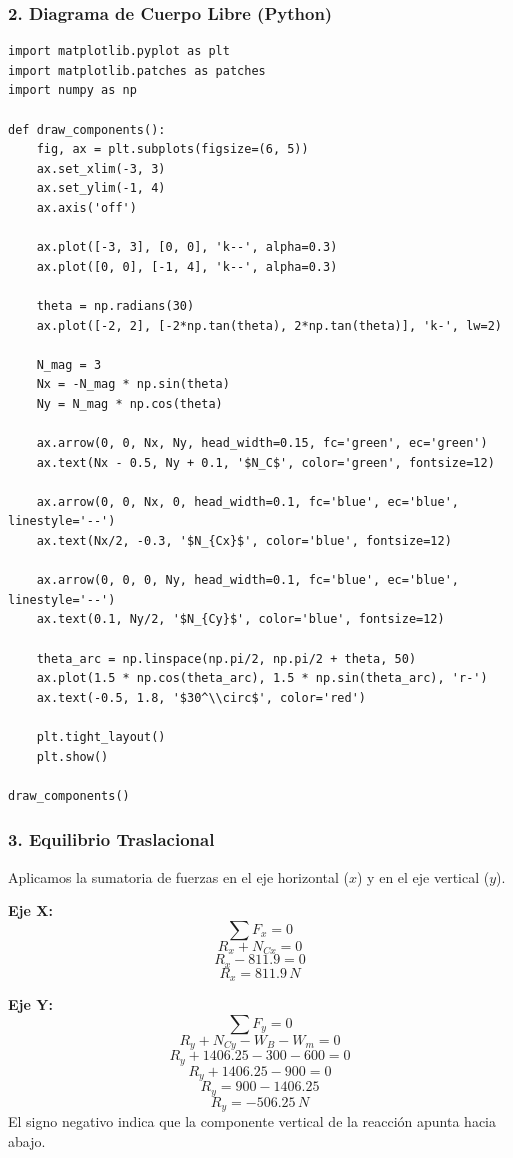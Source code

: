 \documentclass[12pt, a4paper]{article}
\begin{document}
\subsubsection*{2. Diagrama de Cuerpo Libre (Python)}
\begin{lstlisting}
import matplotlib.pyplot as plt
import matplotlib.patches as patches
import numpy as np

def draw_components():
    fig, ax = plt.subplots(figsize=(6, 5))
    ax.set_xlim(-3, 3)
    ax.set_ylim(-1, 4)
    ax.axis('off')
    
    ax.plot([-3, 3], [0, 0], 'k--', alpha=0.3)
    ax.plot([0, 0], [-1, 4], 'k--', alpha=0.3)
    
    theta = np.radians(30)
    ax.plot([-2, 2], [-2*np.tan(theta), 2*np.tan(theta)], 'k-', lw=2)
    
    N_mag = 3
    Nx = -N_mag * np.sin(theta)
    Ny = N_mag * np.cos(theta)
    
    ax.arrow(0, 0, Nx, Ny, head_width=0.15, fc='green', ec='green')
    ax.text(Nx - 0.5, Ny + 0.1, '$N_C$', color='green', fontsize=12)
    
    ax.arrow(0, 0, Nx, 0, head_width=0.1, fc='blue', ec='blue', linestyle='--')
    ax.text(Nx/2, -0.3, '$N_{Cx}$', color='blue', fontsize=12)
    
    ax.arrow(0, 0, 0, Ny, head_width=0.1, fc='blue', ec='blue', linestyle='--')
    ax.text(0.1, Ny/2, '$N_{Cy}$', color='blue', fontsize=12)
    
    theta_arc = np.linspace(np.pi/2, np.pi/2 + theta, 50)
    ax.plot(1.5 * np.cos(theta_arc), 1.5 * np.sin(theta_arc), 'r-')
    ax.text(-0.5, 1.8, '$30^\\circ$', color='red')

    plt.tight_layout()
    plt.show()

draw_components()
\end{lstlisting}

\subsubsection*{3. Equilibrio Traslacional}
Aplicamos la sumatoria de fuerzas en el eje horizontal ($x$) y en el eje vertical ($y$).

\textbf{Eje X:}
$$\sum F_x = 0$$
$$R_x + N_{Cx} = 0$$
$$R_x - 811.9 = 0$$
$$R_x = 811.9 \, \si{N}$$

\textbf{Eje Y:}
$$\sum F_y = 0$$
$$R_y + N_{Cy} - W_B - W_m = 0$$
$$R_y + 1406.25 - 300 - 600 = 0$$
$$R_y + 1406.25 - 900 = 0$$
$$R_y = 900 - 1406.25$$
$$R_y = -506.25 \, \si{N}$$
El signo negativo indica que la componente vertical de la reacción apunta hacia abajo.
\end{document}
